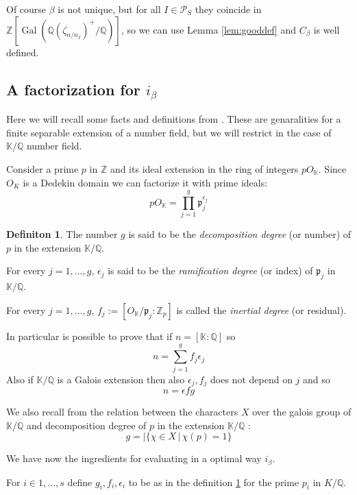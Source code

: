 \documentclass[]{article}
\theoremstyle{plain}
\theoremstyle{remark}
\theoremstyle{definition}
\newtheorem{deff}[teo]{Definiton}
\newcommand{\PS}{\mathcal{P}_S}
\newcommand{\Z}{\mathbb{Z}}
\newcommand{\K}{\mathbb{K}}
\newcommand{\Q}{\mathbb{Q}}
\DeclareMathOperator{\Gal}{Gal}
\begin{document}
	Of course $\beta$ is not unique, but for all $ I \in \PS $ they coincide in $ \Z[\Gal( \Q(\zeta_{n/n_I})^+ / \Q   )]  $, so we can use Lemma \ref{lem:gooddef} and $ C_\beta $ is well defined. 
	
	\subsection{A factorization for $ i_\beta $}
	
	Here we will recall some facts and definitions from \cite[Chapter~11]{RIN}. These are genaralities for a finite separable extension of a number field, but we will restrict in the case of $ \K / \Q$ number field. 
	
	Consider a prime $ p $ in $ \Z $ and its ideal extension in the ring of integers $ pO_\K $. Since $ O_K $ is a Dedekin domain we can factorize it with prime ideals:
	\begin{equation}\label{eq:fact_p}
		pO_\K = \prod_{j=1}^g \mathfrak{p}_j^{\epsilon_j}
	\end{equation} 
	
	\begin{deff} \label{def:degree}
		The number $ g $ is said to be the \textit{decomposition degree} (or number) of $ p $ in the extension $ \K / \Q $.
						
		For every $ j=1, ..., g $, $ \epsilon_j $ is said to be the \textit{ramification degree} (or index) of $ \mathfrak{p}_j $ in $ \K / \Q $.
						
		For every $ j=1, ..., g $, $ f_j := [O_\K / \mathfrak{p}_j : \Z_p ] $ is called the \textit{inertial degree} (or residual). 
	\end{deff}
	
	In particular is possible to prove that if $ n= [\K : \Q] $ so \[n = \sum_{j=1}^g f_j \epsilon_j \] Also if $ \K / \Q $ is a Galois extension then also $ \epsilon_j, f_j$ does not depend on $ j $ and so \[ n = \epsilon fg \]
	
	We also recall from \cite[Theorem~3.7]{CF} the relation between the characters $ X $ over the galois group of $ \K/\Q $ and decomposition degree of $ p $ in the extension $ \K / \Q $ :
	\begin{equation}\label{eq:g_char}
		g = | \{ \chi \in X \,|\, \chi(p)=1 \}
	\end{equation}
	
	
	We have now the ingredients for evaluating in a optimal way $ i_\beta $. 
	
	For $ i\in {1 , ... , s} $ define $ g_i , f_i , \epsilon_i $ to be as in the definition \ref{def:degree} for the prime $ p_i$ in $ K /\Q $.
	
\end{document}
